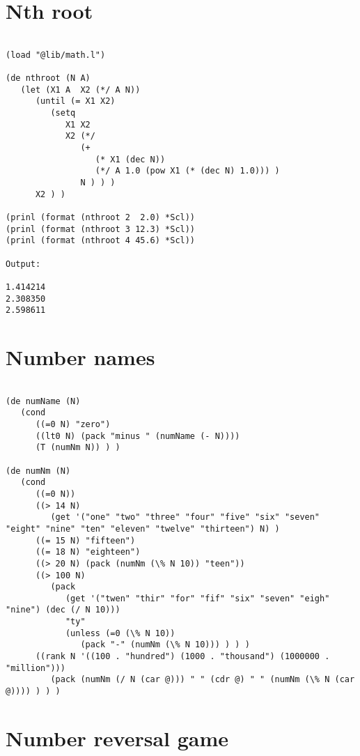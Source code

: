 \section*{Nth root}

\begin{verbatim}

(load "@lib/math.l")

(de nthroot (N A)
   (let (X1 A  X2 (*/ A N))
      (until (= X1 X2)
         (setq
            X1 X2
            X2 (*/
               (+
                  (* X1 (dec N))
                  (*/ A 1.0 (pow X1 (* (dec N) 1.0))) )
               N ) ) )
      X2 ) )

(prinl (format (nthroot 2  2.0) *Scl))
(prinl (format (nthroot 3 12.3) *Scl))
(prinl (format (nthroot 4 45.6) *Scl))

Output:

1.414214
2.308350
2.598611

\end{verbatim}

\section*{Number names}

\begin{verbatim}

(de numName (N)
   (cond
      ((=0 N) "zero")
      ((lt0 N) (pack "minus " (numName (- N))))
      (T (numNm N)) ) )

(de numNm (N)
   (cond
      ((=0 N))
      ((> 14 N)
         (get '("one" "two" "three" "four" "five" "six" "seven" "eight" "nine" "ten" "eleven" "twelve" "thirteen") N) )
      ((= 15 N) "fifteen")
      ((= 18 N) "eighteen")
      ((> 20 N) (pack (numNm (\% N 10)) "teen"))
      ((> 100 N)
         (pack
            (get '("twen" "thir" "for" "fif" "six" "seven" "eigh" "nine") (dec (/ N 10)))
            "ty"
            (unless (=0 (\% N 10))
               (pack "-" (numNm (\% N 10))) ) ) )
      ((rank N '((100 . "hundred") (1000 . "thousand") (1000000 . "million")))
         (pack (numNm (/ N (car @))) " " (cdr @) " " (numNm (\% N (car @)))) ) ) )

\end{verbatim}

\section*{Number reversal game}

